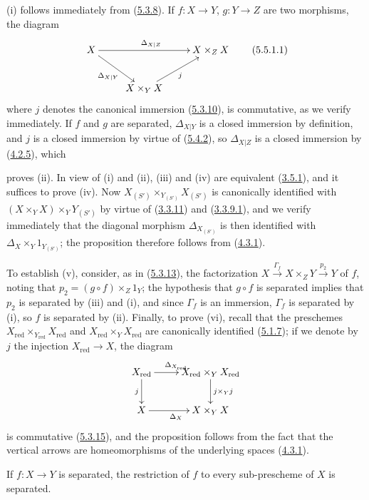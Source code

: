 (i) follows immediately from (\hyperref[I.5.3.8]{5.3.8}). If $f:X\to Y$,
$g:Y\to Z$ are two morphisms, the diagram
\[
  \xymatrix{
    X\ar[rr]^{\Delta_{X|Z}}\ar[dr]_{\Delta_{X|Y}} & &
    X\times_Z X\\
    & X\times_Y X\ar[ur]_j
  }
  \tag{5.5.1.1}\label{I.5.5.1.1}
\]
where $j$ denotes the canonical immersion (\hyperref[I.5.3.10]{5.3.10}), is
commutative, as we verify immediately. If $f$ and $g$ are separated,
$\Delta_{X|Y}$ is a closed immersion by definition, and $j$ is a
closed immersion by virtue of (\hyperref[I.5.4.2]{5.4.2}), so
$\Delta_{X|Z}$ is a closed immersion by
(\hyperref[I.4.2.5]{4.2.5}), which

proves (ii). In view of (i) and (ii), (iii) and (iv) are equivalent
(\hyperref[I.3.5.1]{3.5.1}), and it suffices to prove (iv). Now
$X_{(S')}\times_{Y_{(S')}}X_{(S')}$ is canonically identified with
$(X\times_Y X)\times_Y Y_{(S')}$ by virtue of
(\hyperref[I.3.3.11]{3.3.11}) and
(\hyperref[I.3.3.9.1]{3.3.9.1}), and we verify immediately that the
diagonal morphism $\Delta_{X_{(S')}}$ is then identified with
$\Delta_X\times_Y 1_{Y_{(S')}}$; the proposition therefore follows from
(\hyperref[I.4.3.1]{4.3.1}).

To establish (v), consider, as in
(\hyperref[I.5.3.13]{5.3.13}), the factorization
$X\xrightarrow{\Gamma_f}X\times_Z Y\xrightarrow{p_2}Y$ of $f$, noting
that $p_2=(g\circ f)\times_Z 1_Y$; the hypothesis that $g\circ f$ is separated
implies that $p_2$ is separated by (iii) and (i), and since $\Gamma_f$ is an
immersion, $\Gamma_f$ is separated by (i), so $f$ is separated by (ii).
Finally, to prove (vi), recall that the preschemes
$X_{\mathrm{red}}\times_{Y_{\mathrm{red}}}X_{\mathrm{red}}$ and
$X_{\mathrm{red}}\times_Y X_{\mathrm{red}}$ are canonically identified
(\hyperref[I.5.1.7]{5.1.7}); if we denote by $j$ the injection
$X_{\mathrm{red}}\to X$, the diagram
\[
  \xymatrix{
    X_{\mathrm{red}}\ar[r]^{\Delta_{X_{\mathrm{red}}}}\ar[d]_j &
    X_{\mathrm{red}}\times_Y X_{\mathrm{red}}\ar[d]^{j\times_Y j}\\
    X\ar[r]_{\Delta_X} & X\times_Y X
  }
\]
is commutative (\hyperref[I.5.3.15]{5.3.15}), and the proposition follows
from the fact that the vertical arrows are homeomorphisms of the underlying
spaces (\hyperref[I.4.3.1]{4.3.1}).

\begin{corollary}[5.5.2]
\label{I.5.5.2}
If $f:X\to Y$ is separated, the restriction of $f$ to every sub-prescheme of
$X$ is separated.
\end{corollary}

